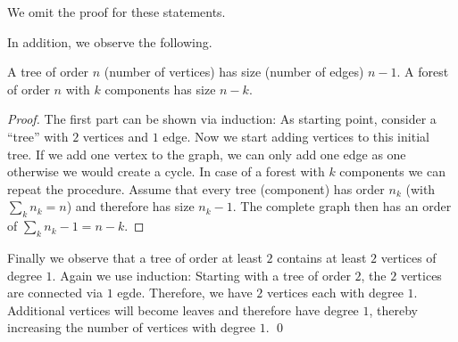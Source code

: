 We omit the proof for these statements.

In addition, we observe the following.

\begin{theorem}
  A tree of order $n$ (number of vertices) has size (number of edges) $n-1$. A forest of order $n$ with $k$ components has size $n-k$.
\end{theorem}

\begin{proof}
The first part can be shown via induction: As starting point, consider a ``tree'' with $2$ vertices and $1$ edge. Now we start adding vertices to this initial tree. If we add one vertex to the graph, we can only add one edge as one otherwise we would create a cycle. In case of a forest with $k$ components we can repeat the procedure. Assume that every tree (component) has order $n_k$ (with $\sum_k n_k = n$) and therefore has size $n_k - 1$. The complete graph then has an order of $\sum_k n_k - 1 = n-k$.
\end{proof}

Finally we observe that a tree of order at least $2$ contains at least $2$ vertices of degree $1$. Again we use induction: Starting with a tree of order $2$, the $2$ vertices are connected via $1$ egde. Therefore, we have $2$ vertices each with degree $1$. Additional vertices will become leaves and therefore have degree $1$, thereby increasing the number of vertices with degree $1$. \qed




